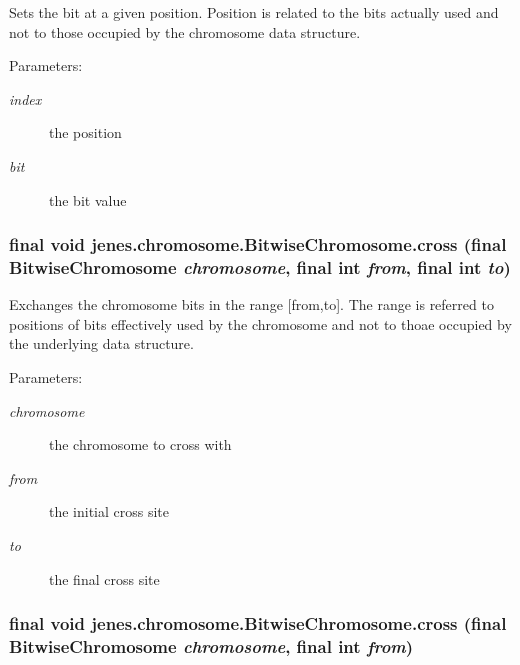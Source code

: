 Sets the bit at a given position. Position is related to the bits actually used and not to those occupied by the chromosome data structure.

\begin{Desc}
\item[Parameters:]
\begin{description}
\item[{\em index}]the position \item[{\em bit}]the bit value \end{description}
\end{Desc}
\hypertarget{classjenes_1_1chromosome_1_1_bitwise_chromosome_2d711baa2a74ccb064d33ef73edbd464}{
\subsubsection[cross]{\setlength{\rightskip}{0pt plus 5cm}final void jenes.chromosome.BitwiseChromosome.cross (final {\bf BitwiseChromosome} {\em chromosome}, \/  final int {\em from}, \/  final int {\em to})}}
\label{classjenes_1_1chromosome_1_1_bitwise_chromosome_2d711baa2a74ccb064d33ef73edbd464}


Exchanges the chromosome bits in the range \mbox{[}from,to\mbox{]}. The range is referred to positions of bits effectively used by the chromosome and not to thoae occupied by the underlying data structure.

\begin{Desc}
\item[Parameters:]
\begin{description}
\item[{\em chromosome}]the chromosome to cross with \item[{\em from}]the initial cross site \item[{\em to}]the final cross site \end{description}
\end{Desc}
\hypertarget{classjenes_1_1chromosome_1_1_bitwise_chromosome_933b1991999fa3b586c1739744751725}{
\subsubsection[cross]{\setlength{\rightskip}{0pt plus 5cm}final void jenes.chromosome.BitwiseChromosome.cross (final {\bf BitwiseChromosome} {\em chromosome}, \/  final int {\em from})}}
\label{classjenes_1_1chromosome_1_1_bitwise_chromosome_933b1991999fa3b586c1739744751725}


